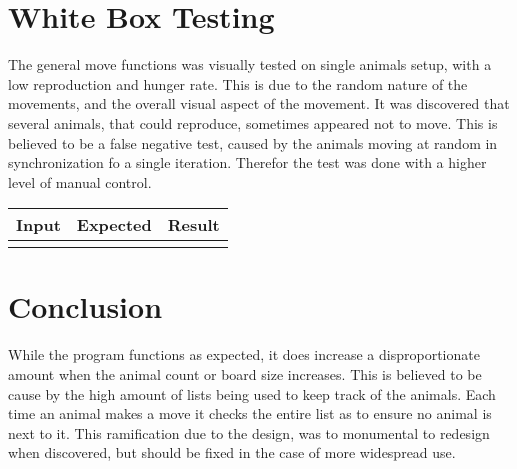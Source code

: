 \documentclass{article}
\begin{document}
         
    \section{White Box Testing}
    The general move functions was visually tested on single animals setup, with a low reproduction and hunger rate. This is due to the random nature of the movements, and the overall visual aspect of the movement. It was discovered that several animals, that could reproduce, sometimes appeared not to move. This is believed to be a false negative test, caused by the animals moving at random in synchronization fo a single iteration. Therefor the test was done with a higher level of manual control. \newline
   	   \begin{tabular}{|c|c|c|}
   	   		\hline
   	   		Input & Expected & Result\\
   	   		\hline
   	   		&&\\
   	   		\hline
   	   \end{tabular}
    \section{Conclusion}
     While the program functions as expected, it does increase a disproportionate amount when the animal count or board size increases. This is believed to be cause by the high amount of lists being used to keep track of the animals. Each time an animal makes a move it checks the entire list as to ensure no animal is next to it. This ramification due to the design, was to monumental to redesign when discovered, but should be fixed in the case of more widespread use. 
\end{document}
